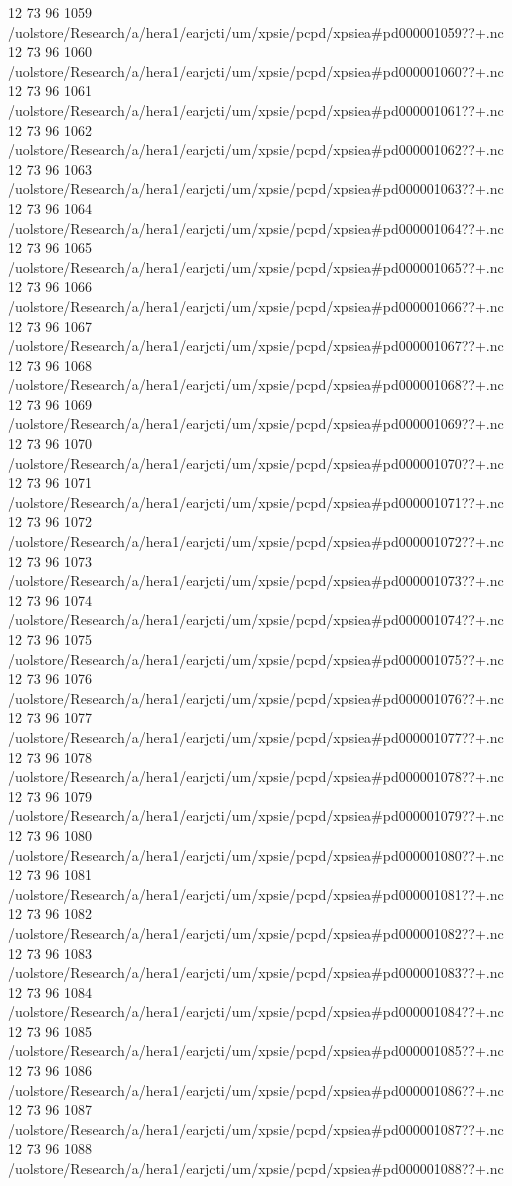 12 73 96
1059
/uolstore/Research/a/hera1/earjcti/um/xpsie/pcpd/xpsiea#pd000001059??+.nc
12 73 96
1060
/uolstore/Research/a/hera1/earjcti/um/xpsie/pcpd/xpsiea#pd000001060??+.nc
12 73 96
1061
/uolstore/Research/a/hera1/earjcti/um/xpsie/pcpd/xpsiea#pd000001061??+.nc
12 73 96
1062
/uolstore/Research/a/hera1/earjcti/um/xpsie/pcpd/xpsiea#pd000001062??+.nc
12 73 96
1063
/uolstore/Research/a/hera1/earjcti/um/xpsie/pcpd/xpsiea#pd000001063??+.nc
12 73 96
1064
/uolstore/Research/a/hera1/earjcti/um/xpsie/pcpd/xpsiea#pd000001064??+.nc
12 73 96
1065
/uolstore/Research/a/hera1/earjcti/um/xpsie/pcpd/xpsiea#pd000001065??+.nc
12 73 96
1066
/uolstore/Research/a/hera1/earjcti/um/xpsie/pcpd/xpsiea#pd000001066??+.nc
12 73 96
1067
/uolstore/Research/a/hera1/earjcti/um/xpsie/pcpd/xpsiea#pd000001067??+.nc
12 73 96
1068
/uolstore/Research/a/hera1/earjcti/um/xpsie/pcpd/xpsiea#pd000001068??+.nc
12 73 96
1069
/uolstore/Research/a/hera1/earjcti/um/xpsie/pcpd/xpsiea#pd000001069??+.nc
12 73 96
1070
/uolstore/Research/a/hera1/earjcti/um/xpsie/pcpd/xpsiea#pd000001070??+.nc
12 73 96
1071
/uolstore/Research/a/hera1/earjcti/um/xpsie/pcpd/xpsiea#pd000001071??+.nc
12 73 96
1072
/uolstore/Research/a/hera1/earjcti/um/xpsie/pcpd/xpsiea#pd000001072??+.nc
12 73 96
1073
/uolstore/Research/a/hera1/earjcti/um/xpsie/pcpd/xpsiea#pd000001073??+.nc
12 73 96
1074
/uolstore/Research/a/hera1/earjcti/um/xpsie/pcpd/xpsiea#pd000001074??+.nc
12 73 96
1075
/uolstore/Research/a/hera1/earjcti/um/xpsie/pcpd/xpsiea#pd000001075??+.nc
12 73 96
1076
/uolstore/Research/a/hera1/earjcti/um/xpsie/pcpd/xpsiea#pd000001076??+.nc
12 73 96
1077
/uolstore/Research/a/hera1/earjcti/um/xpsie/pcpd/xpsiea#pd000001077??+.nc
12 73 96
1078
/uolstore/Research/a/hera1/earjcti/um/xpsie/pcpd/xpsiea#pd000001078??+.nc
12 73 96
1079
/uolstore/Research/a/hera1/earjcti/um/xpsie/pcpd/xpsiea#pd000001079??+.nc
12 73 96
1080
/uolstore/Research/a/hera1/earjcti/um/xpsie/pcpd/xpsiea#pd000001080??+.nc
12 73 96
1081
/uolstore/Research/a/hera1/earjcti/um/xpsie/pcpd/xpsiea#pd000001081??+.nc
12 73 96
1082
/uolstore/Research/a/hera1/earjcti/um/xpsie/pcpd/xpsiea#pd000001082??+.nc
12 73 96
1083
/uolstore/Research/a/hera1/earjcti/um/xpsie/pcpd/xpsiea#pd000001083??+.nc
12 73 96
1084
/uolstore/Research/a/hera1/earjcti/um/xpsie/pcpd/xpsiea#pd000001084??+.nc
12 73 96
1085
/uolstore/Research/a/hera1/earjcti/um/xpsie/pcpd/xpsiea#pd000001085??+.nc
12 73 96
1086
/uolstore/Research/a/hera1/earjcti/um/xpsie/pcpd/xpsiea#pd000001086??+.nc
12 73 96
1087
/uolstore/Research/a/hera1/earjcti/um/xpsie/pcpd/xpsiea#pd000001087??+.nc
12 73 96
1088
/uolstore/Research/a/hera1/earjcti/um/xpsie/pcpd/xpsiea#pd000001088??+.nc
